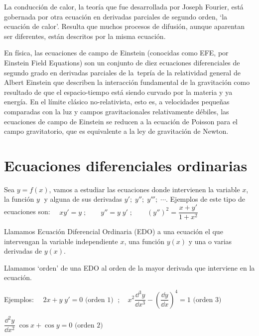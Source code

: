 La conducción de calor, la teoría que fue desarrollada por Joseph Fourier, está gobernada por otra ecuación en derivadas parciales de segundo orden, `la ecuación de calor'. Resulta que muchos procesos de difusión, aunque aparentan ser diferentes, están descritos por la misma ecuación. 

\footnotesize{\textcolor{gris}{En física, las ecuaciones de campo de Einstein (conocidas como EFE, por Einstein Field Equations) son un conjunto de diez ecuaciones diferenciales de segundo grado en derivadas parciales de la tepría de la relatividad general de Albert Einstein que describen la interacción fundamental de la gravitación como resultado de que el espacio-tiempo está siendo curvado por la materia y ya energía. En el límite clásico no-relativista, esto es, a velocidades pequeñas  comparadas con la luz y campos gravitacionales relativamente débiles, las ecuaciones de campo de Einstein se reducen a la ecuación de Poisson para el campo gravitatorio, que es equivalente a la ley de gravitación de Newton}}\normalsize{.}

\rightline{\textcolor{gris}{Fuente: Wikipedia}}

\section{Ecuaciones diferenciales ordinarias}
	
	Sea $y=f(x)$, vamos a estudiar las ecuaciones donde intervienen la variable $x$, la función $y\;$ y alguna de sus derivadas $y';\; y''; \; y'''; \; \cdots$. Ejemplos de este tipo de ecuaciones son:
	$\quad xy'= y\; ; \qquad y''=y\; y'\; ; \qquad (y'')^2=\dfrac {x+y'}{1+x^2}$
	
\begin{defi}
Llamamos Ecuación Diferencial Ordinaria (EDO) a una ecuación el que intervengan la variable independiente $x$, una función $y(x)$ y una o varias derivadas de $y(x)$.	
\end{defi}

\begin{defi}
Llamamos `orden' de una EDO al orden de la mayor derivada que interviene en la ecuación. 
\end{defi}

Ejemplos: $\quad 2x+y\; y'=0 \text{ (orden 1) }\; ; \quad x^2 \dfrac {\dd^3 y}{\dd x^3}- \left( \dfrac {\dd y}{\dd x} \right)^4=1 \text{ (orden 3) }\; $

$ \dfrac {\dd^2 y}{\dd x^2}\; \cos x + \cos y =0 \text{ (orden 2) } $

